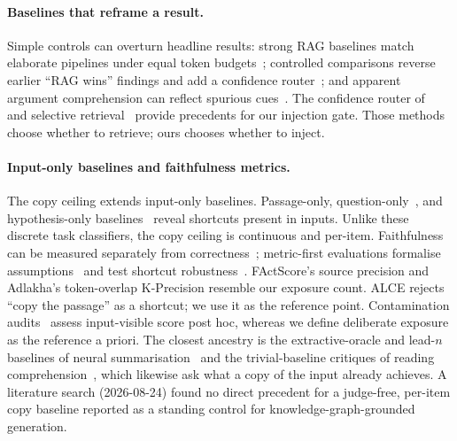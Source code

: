 \documentclass[10pt,twocolumn]{article}
\begin{document}
\paragraph{Baselines that reframe a result.}
Simple controls can overturn headline results: strong RAG baselines match elaborate pipelines under equal token budgets~\cite{laitenberger2025stronger}; controlled comparisons reverse earlier ``RAG wins'' findings and add a confidence router~\cite{li2024ragorlongcontext}; and apparent argument comprehension can reflect spurious cues~\cite{niven2019probing}. The confidence router of~\textcite{li2024ragorlongcontext} and selective retrieval~\cite{asai2024selfrag,jeong2024adaptiverag,mallen2023trust} provide precedents for our injection gate. Those methods choose whether to retrieve; ours chooses whether to inject.

\paragraph{Input-only baselines and faithfulness metrics.}
The copy ceiling extends input-only baselines. Passage-only, question-only~\cite{kaushik2018reading}, and hypothesis-only baselines~\cite{gururangan2018artifacts,poliak2018hypothesis} reveal shortcuts present in inputs. Unlike these discrete task classifiers, the copy ceiling is continuous and per-item. Faithfulness can be measured separately from correctness~\cite{es2023ragas,adlakha2024evaluating,zhou2023contextfaithful}; metric-first evaluations formalise assumptions~\cite{min2023factscore} and test shortcut robustness~\cite{gao2023alce}. FActScore's source precision and Adlakha's token-overlap K-Precision resemble our exposure count. ALCE rejects ``copy the passage'' as a shortcut; we use it as the reference point. Contamination audits~\cite{sainz2023contamination,golchin2024timetravel} assess input-visible score post hoc, whereas we define deliberate exposure as the reference a priori. The closest ancestry is the extractive-oracle and lead-$n$ baselines of neural summarisation~\cite{see2017pointergenerator,narayan2018xsum} and the trivial-baseline critiques of reading comprehension~\cite{kaushik2018reading}, which likewise ask what a copy of the input already achieves. A literature search (2026-08-24) found no direct precedent for a judge-free, per-item copy baseline reported as a standing control for knowledge-graph-grounded generation.
\end{document}
